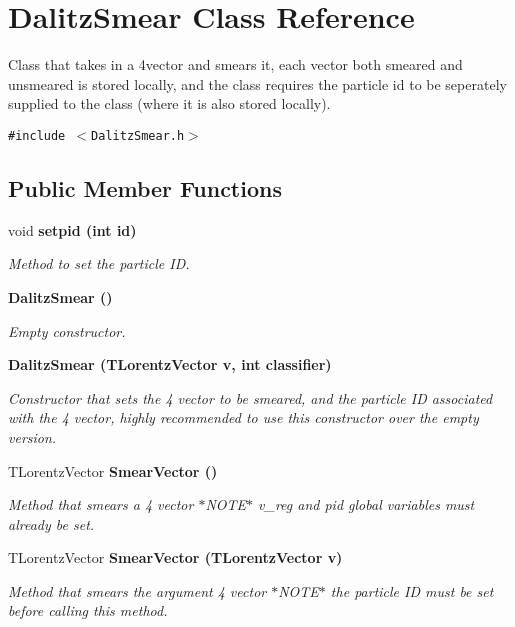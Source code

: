 \section{Dalitz\-Smear Class Reference}
\label{classDalitzSmear}
Class that takes in a 4vector and smears it, each vector both smeared and unsmeared is stored locally, and the class requires the particle id to be seperately supplied to the class (where it is also stored locally).  


{\tt \#include $<$Dalitz\-Smear.h$>$}

\subsection*{Public Member Functions}
\begin{CompactItemize}
\item 
void \bf{setpid} (int id)
\begin{CompactList}\small\item\em Method to set the particle ID. \item\end{CompactList}\item 
\bf{Dalitz\-Smear} ()
\begin{CompactList}\small\item\em Empty constructor. \item\end{CompactList}\item 
\bf{Dalitz\-Smear} (TLorentz\-Vector v, int classifier)
\begin{CompactList}\small\item\em Constructor that sets the 4 vector to be smeared, and the particle ID associated with the 4 vector, highly recommended to use this constructor over the empty version. \item\end{CompactList}\item 
TLorentz\-Vector \bf{Smear\-Vector} ()
\begin{CompactList}\small\item\em Method that smears a 4 vector $\ast$NOTE$\ast$ v\_\-reg and pid global variables must already be set. \item\end{CompactList}\item 
TLorentz\-Vector \bf{Smear\-Vector} (TLorentz\-Vector v)
\begin{CompactList}\small\item\em Method that smears the argument 4 vector $\ast$NOTE$\ast$ the particle ID must be set before calling this method. \item\end{CompactList}\end{CompactItemize}
